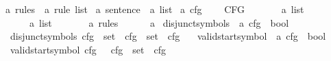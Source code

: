 \begin{isabellebody}
\isanewline
{}\isamarkupfalse%
\ {\isacharprime}{\kern0pt}a\ rules\ {\isacharequal}{\kern0pt}\ {\isachardoublequoteopen}{\isacharprime}{\kern0pt}a\ rule\ list{\isachardoublequoteclose}\isanewline
\isanewline
{}\isamarkupfalse%
\ {\isacharprime}{\kern0pt}a\ sentence\ {\isacharequal}{\kern0pt}\ {\isachardoublequoteopen}{\isacharprime}{\kern0pt}a\ list{\isachardoublequoteclose}\isanewline
\isanewline
{}\isamarkupfalse%
\ {\isacharprime}{\kern0pt}a\ cfg\ {\isacharequal}{\kern0pt}\ \isanewline
\ \ CFG\ \isanewline
\ \ \ \ {\isacharparenleft}{\kern0pt}{\isasymNN}\ {\isacharcolon}{\kern0pt}\ {\isachardoublequoteopen}{\isacharprime}{\kern0pt}a\ list{\isachardoublequoteclose}{\isacharparenright}{\kern0pt}\ \isanewline
\ \ \ \ {\isacharparenleft}{\kern0pt}{\isasymTT}\ {\isacharcolon}{\kern0pt}\ {\isachardoublequoteopen}{\isacharprime}{\kern0pt}a\ list{\isachardoublequoteclose}{\isacharparenright}{\kern0pt}\ \isanewline
\ \ \ \ {\isacharparenleft}{\kern0pt}{\isasymRR}\ {\isacharcolon}{\kern0pt}\ {\isachardoublequoteopen}{\isacharprime}{\kern0pt}a\ rules{\isachardoublequoteclose}{\isacharparenright}{\kern0pt}\isanewline
\ \ \ \ {\isacharparenleft}{\kern0pt}{\isasymSS}\ {\isacharcolon}{\kern0pt}\ {\isachardoublequoteopen}{\isacharprime}{\kern0pt}a{\isachardoublequoteclose}{\isacharparenright}{\kern0pt}\isanewline
\isanewline
{}\isamarkupfalse%
\ disjunct{\isacharunderscore}{\kern0pt}symbols\ {\isacharcolon}{\kern0pt}{\isacharcolon}{\kern0pt}\ {\isachardoublequoteopen}{\isacharprime}{\kern0pt}a\ cfg\ {\isasymRightarrow}\ bool{\isachardoublequoteclose}\ \isanewline
\ \ {\isachardoublequoteopen}disjunct{\isacharunderscore}{\kern0pt}symbols\ cfg\ {\isasymlongleftrightarrow}\ set\ {\isacharparenleft}{\kern0pt}{\isasymNN}\ cfg{\isacharparenright}{\kern0pt}\ {\isasyminter}\ set\ {\isacharparenleft}{\kern0pt}{\isasymTT}\ cfg{\isacharparenright}{\kern0pt}\ {\isacharequal}{\kern0pt}\ {\isacharbraceleft}{\kern0pt}{\isacharbraceright}{\kern0pt}{\isachardoublequoteclose}\isanewline
\isanewline
{}\isamarkupfalse%
\ valid{\isacharunderscore}{\kern0pt}startsymbol\ {\isacharcolon}{\kern0pt}{\isacharcolon}{\kern0pt}\ {\isachardoublequoteopen}{\isacharprime}{\kern0pt}a\ cfg\ {\isasymRightarrow}\ bool{\isachardoublequoteclose}\ \isanewline
\ \ {\isachardoublequoteopen}valid{\isacharunderscore}{\kern0pt}startsymbol\ cfg\ {\isasymlongleftrightarrow}\ {\isasymSS}\ cfg\ {\isasymin}\ set\ {\isacharparenleft}{\kern0pt}{\isasymNN}\ cfg{\isacharparenright}{\kern0pt}{\isachardoublequoteclose}\isanewline

\end{isabellebody}
